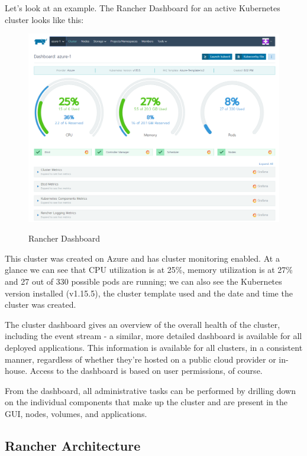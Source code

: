 Let's look at an example. The Rancher Dashboard for an active Kubernetes cluster looks like this:

\begin{figure}[H]
\centering
\caption {Rancher Dashboard}
\includegraphics[width=\linewidth]{images/dashboard}
\label{fig:rancherDashboard}
\end{figure}

This cluster was created on Azure and has cluster monitoring enabled. At a glance we can see that CPU utilization is at 25\%, memory utilization is at 27\% and 27 out of 330 possible pods are running; we can also see the Kubernetes version installed (v1.15.5), the cluster template used and the date and time the cluster was created.

The cluster dashboard gives an overview of the overall health of the cluster, including the event stream - a similar, more detailed dashboard is available for all deployed applications. This information is available for all clusters, in a consistent manner, regardless of whether they're hosted on a public cloud provider or in-house. Access to the dashboard is based on user permissions, of course.

From the dashboard, all administrative tasks can be performed by drilling down on the individual components that make up the cluster and are present in the GUI, nodes, volumes, and applications.

\subsection{Rancher Architecture}

